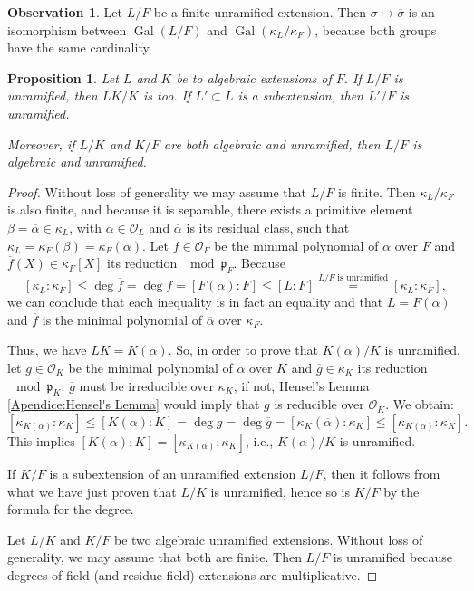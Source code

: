 \documentclass[12pt]{article}
\theoremstyle{plain}
\newtheorem{proposition}[theorem]{Proposition}
\theoremstyle{definition}
\newtheorem{obs}[theorem]{Observation}
\renewcommand{\bar}[1]{\overline{#1}}
\newcommand{\Gal}[2]{\operatorname{Gal} ( #1 / #2 )}
\newcommand{\primo}[1]{\mathfrak{#1}}
\renewcommand{\O}{\mathcal{O}}
\begin{document}
\begin{obs}\label{obs:if L/F is finite unramified then it is isomorphic to its galois group}
Let $L/F$ be a finite unramified extension. Then $\sigma \mapsto \bar \sigma$ is an isomorphism between $\Gal L F$ and $\Gal {\kappa_L} {\kappa_F}$, because both groups have the same cardinality.
\end{obs}

\begin{proposition}\label{proposition: unramified extensions behave well in towers}
Let $L$ and $K$ be to algebraic extensions of $F$. If $L/F$ is unramified, then $LK /K$ is too. If $L' \subset L$ is a subextension, then $L' /F$ is unramified.

Moreover, if $L/K$ and $K/F$ are both algebraic and unramified, then $L/F$ is algebraic and unramified.
\end{proposition}
\begin{proof}
Without loss of generality we may assume that $L/F$ is finite. Then $\kappa_L / \kappa_F$ is also finite, and because it is separable, there exists a primitive element $\beta = \bar \alpha \in \kappa_L$, with $\alpha \in \O_L$ and $\bar \alpha$ is its residual class, such that $\kappa_L = \kappa_F (\beta) = \kappa_F (\bar \alpha)$. Let $f \in \O_F$ be the minimal polynomial of $\alpha$ over $F$ and $\bar f(X) \in \kappa_F [X]$ its reduction $\mod \primo{p}_F$. Because
\[
    [\kappa_L : \kappa_F] \leq \deg {\bar f} = \deg f = [F(\alpha) : F] \leq [L : F] \overset{\text{$L/F$ is unramified}}{=} [\kappa_L : \kappa_F],
\]
we can conclude that each inequality is in fact an equality and that $L = F (\alpha)$ and $\bar f$ is the minimal polynomial of $\bar \alpha$ over $\kappa_F$.

Thus, we have $L K = K (\alpha)$. So, in order to prove that $K (\alpha)/K$ is unramified, let $g \in \O_K$ be the minimal polynomial of $\alpha$ over $K$ and $\bar g \in \kappa_K$ its reduction $\mod \primo p _K$. $\bar g$ must be irreducible over $\kappa_K$, if not, Hensel's Lemma \ref{Apendice:Hensel's Lemma} would imply that $g$ is reducible over $\O_{K}$. We obtain:
\[
    [\kappa_{K (\alpha)}: \kappa_K] \leq [K (\alpha) : K] = \deg g = \deg {\bar g} = [\kappa_{K} (\bar \alpha) : \kappa_K] \leq [\kappa_{K (\alpha)} : \kappa_K].
\]
This implies $[K (\alpha): K] = [\kappa_{K (\alpha)} : \kappa_K]$, i.e., $K (\alpha)/K$ is unramified.

\bigskip

If $K/F$ is a subextension of an unramified extension $L/F$, then it follows from what we have just proven that $L/K$ is unramified, hence so is $K/F$ by the formula for the degree.

\bigskip

Let $L/K$ and $K/F$ be two algebraic unramified extensions. Without loss of generality, we may assume that both are finite. Then $L /F$ is unramified because degrees of field (and residue field) extensions are multiplicative.
\end{proof}
\end{document}
